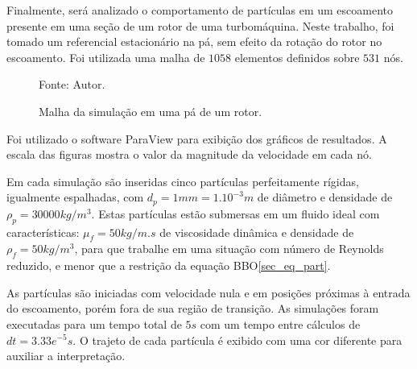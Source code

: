 \begin{itemize}
        Finalmente, será analizado o comportamento de partículas em um escoamento presente em uma seção de um rotor de uma turbomáquina.
        Neste trabalho, foi tomado um referencial estacionário na pá, sem efeito da rotação do rotor no escoamento.
        Foi utilizada uma malha de $1058$ elementos definidos sobre $531$ nós.
        \begin{figure}[H]
            \centering
             {\raggedleft \scriptsize Fonte: Autor.}
            \caption{Malha da simulação em uma pá de um rotor.}
            \label{rotor_mesh}
        \end{figure}
\end{itemize}

Foi utilizado o software ParaView\cite{paraview} para exibição dos gráficos de resultados.
A escala das figuras mostra o valor da magnitude da velocidade em cada nó.

Em cada simulação são inseridas cinco partículas perfeitamente rígidas, igualmente espalhadas, com $d_p=1mm=1.10^{-3}m$ de diâmetro e densidade de $\rho_p=30000kg/m^3$.
Estas partículas estão submersas em um fluido ideal com características: $\mu_f=50kg/m.s$ de viscosidade dinâmica e densidade de $\rho_f=50kg/m^3$, para que trabalhe em uma situação com número de Reynolds reduzido, e menor que a restrição da equação BBO\ref{sec_eq_part}.

As partículas são iniciadas com velocidade nula e em posições próximas à entrada do escoamento, porém fora de sua região de transição.
As simulações foram executadas para um tempo total de $5s$ com um tempo entre cálculos de $dt=3.33e^{-5}s$.
O trajeto de cada partícula é exibido com uma cor diferente para auxiliar a interpretação. 

